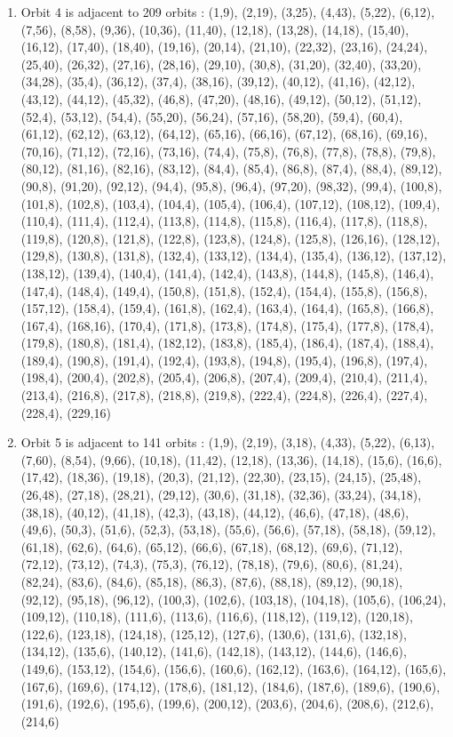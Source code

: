 \documentclass[12pt]{article}
\begin{document}
\begin{enumerate}
\item Orbit 4 is adjacent to 209 orbits : (1,9), (2,19), (3,25), (4,43), (5,22), (6,12), (7,56), (8,58), (9,36), (10,36), (11,40), (12,18), (13,28), (14,18), (15,40), (16,12), (17,40), (18,40), (19,16), (20,14), (21,10), (22,32), (23,16), (24,24), (25,40), (26,32), (27,16), (28,16), (29,10), (30,8), (31,20), (32,40), (33,20), (34,28), (35,4), (36,12), (37,4), (38,16), (39,12), (40,12), (41,16), (42,12), (43,12), (44,12), (45,32), (46,8), (47,20), (48,16), (49,12), (50,12), (51,12), (52,4), (53,12), (54,4), (55,20), (56,24), (57,16), (58,20), (59,4), (60,4), (61,12), (62,12), (63,12), (64,12), (65,16), (66,16), (67,12), (68,16), (69,16), (70,16), (71,12), (72,16), (73,16), (74,4), (75,8), (76,8), (77,8), (78,8), (79,8), (80,12), (81,16), (82,16), (83,12), (84,4), (85,4), (86,8), (87,4), (88,4), (89,12), (90,8), (91,20), (92,12), (94,4), (95,8), (96,4), (97,20), (98,32), (99,4), (100,8), (101,8), (102,8), (103,4), (104,4), (105,4), (106,4), (107,12), (108,12), (109,4), (110,4), (111,4), (112,4), (113,8), (114,8), (115,8), (116,4), (117,8), (118,8), (119,8), (120,8), (121,8), (122,8), (123,8), (124,8), (125,8), (126,16), (128,12), (129,8), (130,8), (131,8), (132,4), (133,12), (134,4), (135,4), (136,12), (137,12), (138,12), (139,4), (140,4), (141,4), (142,4), (143,8), (144,8), (145,8), (146,4), (147,4), (148,4), (149,4), (150,8), (151,8), (152,4), (154,4), (155,8), (156,8), (157,12), (158,4), (159,4), (161,8), (162,4), (163,4), (164,4), (165,8), (166,8), (167,4), (168,16), (170,4), (171,8), (173,8), (174,8), (175,4), (177,8), (178,4), (179,8), (180,8), (181,4), (182,12), (183,8), (185,4), (186,4), (187,4), (188,4), (189,4), (190,8), (191,4), (192,4), (193,8), (194,8), (195,4), (196,8), (197,4), (198,4), (200,4), (202,8), (205,4), (206,8), (207,4), (209,4), (210,4), (211,4), (213,4), (216,8), (217,8), (218,8), (219,8), (222,4), (224,8), (226,4), (227,4), (228,4), (229,16)
\item Orbit 5 is adjacent to 141 orbits : (1,9), (2,19), (3,18), (4,33), (5,22), (6,13), (7,60), (8,54), (9,66), (10,18), (11,42), (12,18), (13,36), (14,18), (15,6), (16,6), (17,42), (18,36), (19,18), (20,3), (21,12), (22,30), (23,15), (24,15), (25,48), (26,48), (27,18), (28,21), (29,12), (30,6), (31,18), (32,36), (33,24), (34,18), (38,18), (40,12), (41,18), (42,3), (43,18), (44,12), (46,6), (47,18), (48,6), (49,6), (50,3), (51,6), (52,3), (53,18), (55,6), (56,6), (57,18), (58,18), (59,12), (61,18), (62,6), (64,6), (65,12), (66,6), (67,18), (68,12), (69,6), (71,12), (72,12), (73,12), (74,3), (75,3), (76,12), (78,18), (79,6), (80,6), (81,24), (82,24), (83,6), (84,6), (85,18), (86,3), (87,6), (88,18), (89,12), (90,18), (92,12), (95,18), (96,12), (100,3), (102,6), (103,18), (104,18), (105,6), (106,24), (109,12), (110,18), (111,6), (113,6), (116,6), (118,12), (119,12), (120,18), (122,6), (123,18), (124,18), (125,12), (127,6), (130,6), (131,6), (132,18), (134,12), (135,6), (140,12), (141,6), (142,18), (143,12), (144,6), (146,6), (149,6), (153,12), (154,6), (156,6), (160,6), (162,12), (163,6), (164,12), (165,6), (167,6), (169,6), (174,12), (178,6), (181,12), (184,6), (187,6), (189,6), (190,6), (191,6), (192,6), (195,6), (199,6), (200,12), (203,6), (204,6), (208,6), (212,6), (214,6)

\end{enumerate}
\end{document}
